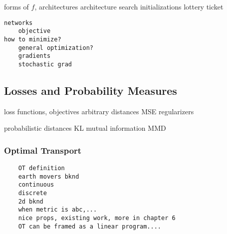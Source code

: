 forms of $f$, architectures
	architecture search
	initializations
		lottery ticket
		


\begin{verbatim}
networks
    objective
how to minimize?
    general optimization?
    gradients
    stochastic grad
\end{verbatim}

\subsection{Losses and Probability Measures}
loss functions, objectives
arbitrary distances
MSE
regularizers

probabilistic distances
KL
mutual information
MMD

\subsubsection{Optimal Transport}	
\begin{verbatim}
	OT definition
	earth movers bknd
	continuous
	discrete
	2d bknd
	when metric is abc,...
	nice props, existing work, more in chapter 6
    OT can be framed as a linear program....
\end{verbatim}
    
